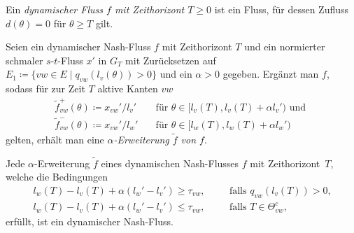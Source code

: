 \begin{frame}
	\begin{definition}
		Ein \emph{dynamischer Fluss $f$ mit Zeithorizont $T\geq0$} ist ein Fluss, für dessen Zufluss $d(\theta)= 0$ für $\theta\geq T$ gilt.
	\end{definition}

	\begin{definition}
		Seien ein dynamischer Nash-Fluss $f$ mit Zeithorizont $T$ und ein normierter schmaler $s$-$t$-Fluss $x'$ in $G_T$ mit Zurücksetzen auf $E_1 \coloneq \{ vw\in E \mid q_{vw}(l_v(\theta)) > 0 \}$ und ein $\alpha > 0$ gegeben.
		Ergänzt man $f$, sodass für zur Zeit $T$ aktive Kanten $vw$
		\begin{align*}
			\tilde{f}_{vw}^+(\theta)\coloneq x_{vw}'/l_v'& \text{~~~für $\theta\in [l_v(T), l_v(T)+\alpha l_v')$ und } \\
			\tilde{f}_{vw}^-(\theta)\coloneq x_{vw}'/l_w'& \text{~~~für $\theta\in [l_w(T), l_w(T)+\alpha l_w')$}
		\end{align*}
		gelten, erhält man eine \emph{$\alpha$-Erweiterung $\tilde{f}$ von $f$}.
	\end{definition}
\end{frame}

\begin{frame}
	\begin{theorem}
		Jede $\alpha$-Erweiterung $\tilde{f}$ eines dynamischen Nash-Flusses $f$ mit Zeithorizont~$T$, welche die Bedingungen
		\begin{align*}
			l_w(T) - l_v(T) + \alpha(l_w' - l_v') \geq \tau_{vw}, &\text{ ~~~~falls $q_{vw}(l_v(T)) > 0$,}\\
			l_w(T) - l_v(T) + \alpha(l_w' - l_v') \leq \tau_{vw}, &\text{ ~~~~falls $T\in\Theta_{vw}^c $,}
		\end{align*}
		erfüllt, ist ein dynamischer Nash-Fluss.
	\end{theorem}
\end{frame}
